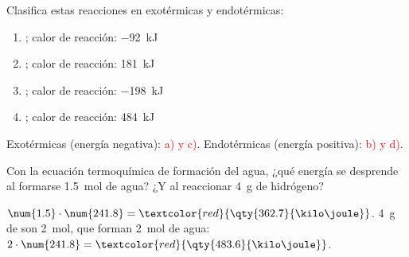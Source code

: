 \begin{exercise}
    Clasifica estas reacciones en exotérmicas y endotérmicas:
    \begin{enumerate}[label=\alph*)]
        \item {}; calor de reacción: \qty{-92}{\kilo\joule}
        \item {}; calor de reacción: \qty{+181}{\kilo\joule}
        \item {}; calor de reacción: \qty{-198}{\kilo\joule}
        \item {}; calor de reacción: \qty{+484}{\kilo\joule}
    \end{enumerate}
    \begin{solu}
        Exotérmicas (energía negativa): \textcolor{red}{a) y c)}. Endotérmicas (energía positiva): \textcolor{red}{b) y d)}.
    \end{solu}
\end{exercise}

\begin{exercise}
    Con la ecuación termoquímica de formación del agua, ¿qué energía se desprende al formarse \qty{1.5}{\mol} de agua? ¿Y al reaccionar \qty{4}{\gram} de hidrógeno?
    \begin{solu}
        \(\num{1.5} \cdot \num{241.8} = \textcolor{red}{\qty{362.7}{\kilo\joule}}\). \qty{4}{\gram} de  son \qty{2}{\mol}, que forman \qty{2}{\mol} de agua: \(2 \cdot \num{241.8} = \textcolor{red}{\qty{483.6}{\kilo\joule}}\).
    \end{solu}
\end{exercise}

